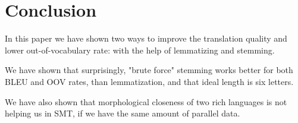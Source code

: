 \documentclass[11pt,letterpaper]{article}
\begin{document}



\section{Conclusion}
In this paper we have shown two ways to improve the translation quality and lower out-of-vocabulary rate: with the help of lemmatizing and stemming. 


We have shown that surprisingly, "brute force" stemming works better for both BLEU and OOV rates, than lemmatization, and that ideal length is six letters. 

We have also shown that morphological closeness of two rich languages is not helping us in SMT, if we have the same amount of parallel data.




\end{document}
